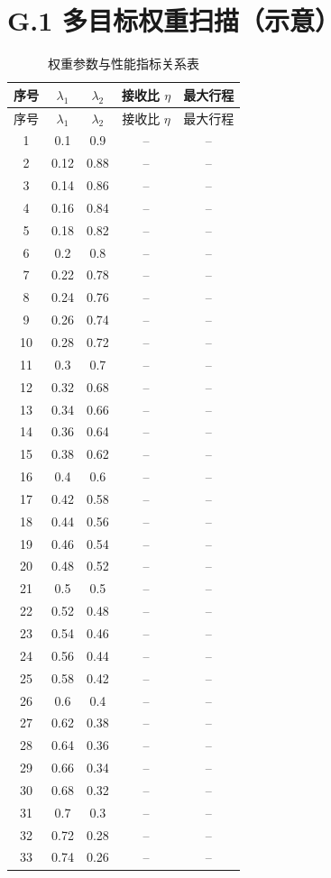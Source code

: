 \section*{G.1 多目标权重扫描（示意）}
\small
\begin{longtable}{ccccc}
\caption{权重参数与性能指标关系表}\\
\toprule
序号 & $\lambda_1$ & $\lambda_2$ & 接收比 $\eta$ & 最大行程\\
\midrule
\endfirsthead
\toprule
序号 & $\lambda_1$ & $\lambda_2$ & 接收比 $\eta$ & 最大行程\\
\midrule
\endhead
1&0.1&0.9&--&--\\
2&0.12&0.88&--&--\\
3&0.14&0.86&--&--\\
4&0.16&0.84&--&--\\
5&0.18&0.82&--&--\\
6&0.2&0.8&--&--\\
7&0.22&0.78&--&--\\
8&0.24&0.76&--&--\\
9&0.26&0.74&--&--\\
10&0.28&0.72&--&--\\
11&0.3&0.7&--&--\\
12&0.32&0.68&--&--\\
13&0.34&0.66&--&--\\
14&0.36&0.64&--&--\\
15&0.38&0.62&--&--\\
16&0.4&0.6&--&--\\
17&0.42&0.58&--&--\\
18&0.44&0.56&--&--\\
19&0.46&0.54&--&--\\
20&0.48&0.52&--&--\\
21&0.5&0.5&--&--\\
22&0.52&0.48&--&--\\
23&0.54&0.46&--&--\\
24&0.56&0.44&--&--\\
25&0.58&0.42&--&--\\
26&0.6&0.4&--&--\\
27&0.62&0.38&--&--\\
28&0.64&0.36&--&--\\
29&0.66&0.34&--&--\\
30&0.68&0.32&--&--\\
31&0.7&0.3&--&--\\
32&0.72&0.28&--&--\\
33&0.74&0.26&--&--\\

\end{longtable}
